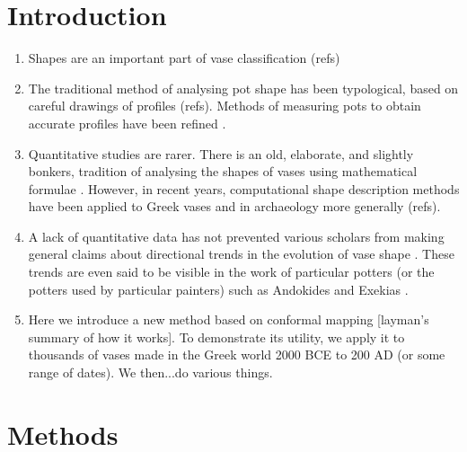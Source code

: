 \documentclass[onecolumn,10pt]{article}
\begin{document}
\section*{Introduction}

\begin{enumerate}
    \item Shapes are an important part of vase classification (refs)
    \item The traditional method of analysing pot shape has been typological, based on careful drawings of profiles (refs). Methods of measuring pots to obtain accurate profiles have been refined \parencite{Mackay2010}. 
    \item Quantitative studies are rarer. There is an old, elaborate, and slightly bonkers, tradition of analysing the shapes of vases using mathematical formulae \parencite{Richter1922}. However, in recent years, computational shape description methods have been applied to Greek vases \parencite{Ryan2009} and in archaeology more generally (refs).
    \item A lack of quantitative data has not prevented various scholars from making general claims about directional trends in the evolution of vase shape \textcite{Bloesch1940, Bloesch1951}.  These trends are even said to be visible in the work of particular potters (or the potters used by particular painters) such as Andokides and Exekias \parencite{Mackay2010}. 
    \item Here we introduce a new method based on conformal mapping [layman's summary of how it works]. To demonstrate its utility, we apply it to thousands of vases made in the Greek world 2000 BCE to 200 AD (or some range of dates). We then...do various things.
    
\end{enumerate}

\clearpage

\section*{Methods}
\end{document}
